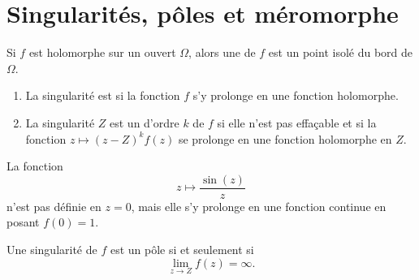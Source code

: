 
\section{Singularités, pôles et méromorphe}

\begin{definition}
    Si \( f\) est holomorphe sur un ouvert \( \Omega\), alors une  de \( f\) est un point isolé du bord de \( \Omega\).
    \begin{enumerate}
        \item
            La singularité est  si la fonction \( f\) s'y prolonge en une fonction holomorphe.
        \item
            La singularité \( Z\) est un  d'ordre \( k\) de \( f\) si elle n'est pas effaçable et si la fonction \( z\mapsto (z-Z)^kf(z)\) se prolonge en une fonction holomorphe en \( Z\).
    \end{enumerate}
\end{definition}

\begin{example}
    La fonction
    \begin{equation}
        z\mapsto \frac{ \sin(z) }{ z }
    \end{equation}
    n'est pas définie en \( z=0\), mais elle s'y prolonge en une fonction continue en posant \( f(0)=1\).
\end{example}

\begin{proposition}
    Une singularité de \( f\) est un pôle si et seulement si
    \begin{equation}
        \lim_{z\to Z}f(z)=\infty.
    \end{equation}
\end{proposition}

